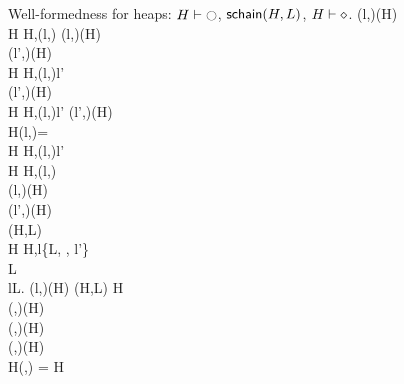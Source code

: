 \documentclass{article}
\begin{document}
  \begin{display}{Well-formedness for heaps: $H\vdash\ocircle$, $\mathsf{schain}(H,L)$, $H\vdash\diamond$.}
  \staterule{}
  {(l,\protop)\in\domain(H)\\
  H\iswf}
  {H\sep(l,)\pointsto{}\iswf}
  \rsep
  \staterule{}
  {(l,\protop)\in\domain(H)\\
  (l',\protop)\in\domain(H)\\
  H\iswf}
  {H\sep(l,)\pointsto l'\iswf}
  \\[\gap]
  
  \staterule{}
  {(l',\protop)\in\domain(H)\\
  H\iswf}
  {H\sep(l,\protop)\pointsto l'\iswf}
  \rsep
  \staterule{}
  {(l',\protop)\in\domain(H)\\
  H(l,\protop)=\nil\\
  H\iswf}
  {H\sep(l,\thisp)\pointsto l'\iswf}
  \\[\gap]
  \staterule{}
  {}
  {\emp\iswf}
  \rsep
  \staterule{}
  {H\iswf}
  {H\sep(l,\protop)\pointsto \nil\iswf}
  \\[\gap]
  
  \staterule{}
  {(l,\protop)\in\domain(H)\\
  (l',\protop)\in\domain(H)\\
  \schain(H,L)\\
  H\iswf}
  {H\sep l\pointsto\{\scopep\ty L, \bodyp\ty \lambda{}, \ty l'\}\iswf}
  \\[\gap]
  
  \staterule{}
  {\lgo\in L\\
  \forall l\in L. (l,\protop)\in \domain(H)}
  {\schain(H,L\append [\lgs])}
  \rsep
  \staterule{}
  {H\iswf\\
  (\lop,\protop)\in\domain(H)\\
  (\lfp,\protop)\in\domain(H)\\
  (\lge,\protop)\in\domain(H)\\  
  H(\lgs,\thisp) = \lgo}
  {H\isok}
  \end{display}
%
\end{document}
